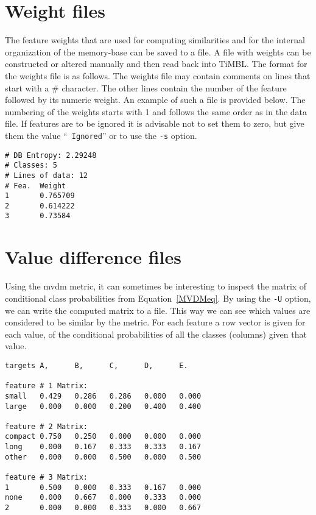 \documentclass{report}
\begin{document}
\section{Weight files}
\label{weightformat}

The feature weights that are used for computing similarities and for
the internal organization of the memory-base can be saved to a file.
A file with weights can be constructed or altered manually and then
read back into TiMBL. The format for the weights file is as follows.
The weights file may contain comments on lines that start with a \#
character. The other lines contain the number of the feature followed
by its numeric weight. An example of such a file is provided
below. The numbering of the weights starts with 1 and follows the same
order as in the data file. If features are to be ignored it is
advisable not to set them to zero, but give them the value ``{\tt
Ignored}'' or to use the {\tt -s} option.

\begin{footnotesize}
\begin{verbatim}
# DB Entropy: 2.29248
# Classes: 5
# Lines of data: 12
# Fea.  Weight
1       0.765709
2       0.614222
3       0.73584
\end{verbatim}
\end{footnotesize}

\section{Value difference files}
\label{mvdmformat}

Using the {\sc mvdm} metric, it can sometimes be interesting to
inspect the matrix of conditional class probabilities from
Equation~\ref{MVDMeq}. By using the {\tt -U} option, we can write the
computed matrix to a file. This way we can see which values are
considered to be similar by the metric. For each feature a row vector
is given for each value, of the conditional probabilities of all the
classes (columns) given that value.

\begin{footnotesize}
\begin{verbatim}
targets A,      B,      C,      D,      E.

feature # 1 Matrix: 
small   0.429   0.286   0.286   0.000   0.000
large   0.000   0.000   0.200   0.400   0.400
 
feature # 2 Matrix: 
compact 0.750   0.250   0.000   0.000   0.000
long    0.000   0.167   0.333   0.333   0.167
other   0.000   0.000   0.500   0.000   0.500
 
feature # 3 Matrix: 
1       0.500   0.000   0.333   0.167   0.000
none    0.000   0.667   0.000   0.333   0.000
2       0.000   0.000   0.333   0.000   0.667
\end{verbatim}
\end{footnotesize}
\end{document}
